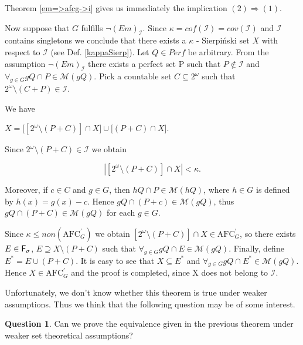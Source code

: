 \documentclass[b5cutpaper, twoside, 11pt, leqno]{moravica}
\newcommand{\calI}{\mathcal{I}}
\newcommand{\afc}{\mathrm{AFC}}
\newcommand{\afcp}{\afc^\prime}
\newcommand\afcg{\afcp_{G}}
\newcommand{\seq}{\subseteq}
\newcommand{\ca}{2^{\omega}}
\newcommand{\mgr}{\mathcal{M}}
\newcommand{\perf}{\mathit{Perf}}
\newcommand{\fsigma}{{\sf F}_{\sigma}}
\newcommand{\cof}{\mathit{cof}}
\newcommand{\cov}{\mathit{cov}}
\newcommand{\non}{\mathit{non}}
\theoremstyle{definition}
\newtheorem{question}[theorem]{Question}
\begin{document}
\proof

Theorem \ref{em=>afcg->i}
gives us immediately the implication $(2) \Rightarrow (1)$.


  Now suppose that $G$ fulfills $\neg (Em)_{\calI}$.
Since $\kappa = \cof(\calI) = \cov(\calI)$
and $\calI$ contains singletons we conclude that
there exists a $\kappa$ - Sierpi\'nski set $X$ with
respect to $\calI$ (see Def. \ref{kappaSierp}).
  Let $Q \in \perf$ be arbitrary.
From the assumption $\neg (Em)_{\calI}$
there exists a perfect set P
such that $P \not\in \calI$ and
$\forall_{g \in G} gQ \cap P \in \mgr(gQ)$.
  Pick a countable set $C \seq \ca$ such that
$\ca \setminus (C+P) \in \calI$.

We have

$X =
  \big[ [\ca \setminus (P+C) ] \cap X \big]
\cup
  \big[ (P+C) \cap X \big]$.

Since $\ca \setminus (P + C) \in \calI$ we obtain

\[ | [ \ca \setminus (P + C) ] \cap X | < \kappa. \]

Moreover, if $c \in C$ and $g \in G$, then
$hQ \cap P \in \mgr(hQ)$,
where $h \in G$ is defined by $h(x) = g(x) - c$.
  Hence $gQ \cap (P + c) \in \mgr(gQ)$,
thus
  $gQ \cap (P + C) \in \mgr(gQ)$ for each $g \in G$.

  Since $\kappa \leq \non(\afcg)$ we obtain
$[ \ca \setminus (P+C)] \cap X \in \afcg$,
so there exists $E \in \fsigma$,
$E \supseteq X \setminus (P + C)$ such that
$\forall_{g \in G} gQ \cap E \in \mgr(gQ)$.
  Finally, define $E^* = E \cup (P + C)$.
It is easy to see that $X \seq E^*$ and
$\forall_{g \in G} gQ \cap E^* \in \mgr(gQ)$.
  Hence $X \in \afcg$ and the proof is
completed, since X does not belong to $\calI$.
\medskip

  Unfortunately, we don't know whether this
theorem is true under weaker assumptions.
  Thus we think that the following question may be of
some interest.

\begin{question}
Can we prove the equivalence given in the previous theorem
under weaker set theoretical assumptions?
\end{question}

\end{document}

